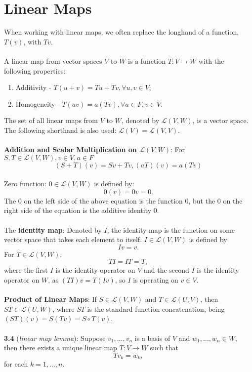 \documentclass{article}
\theoremstyle{definition}
\begin{document}
\section{Linear Maps}
When working with linear maps, we often replace the longhand of a function, $T(v)$, with $Tv$. \\ \\
A linear map from vector spaces $V$ to $W$ is a function $T: V \rightarrow W$ with the following properties:
\begin{enumerate}
\item Additivity - $T(u + v) = Tu + Tv, \forall u, v \in V$;
\item Homogeneity - $T(av) = a(Tv), \forall a \in F, v \in V$.
\end{enumerate} $ $ \\
The set of all linear maps from $V$ to $W$, denoted by $\mathcal{L}(V, W)$, is a vector space. The following shorthand is also used: $\mathcal{L}(V) = \mathcal{L}(V, V).$ \\ \\
\textbf{Addition and Scalar Multiplication on $\mathcal{L}(V, W)$}: For $S, T \in \mathcal{L}(V, W), v \in V, a \in F$ $$(S + T)(v) = Sv + Tv, (aT)(v) = a(Tv)$$ \\
Zero function: $0 \in \mathcal{L}(V, W)$ is defined by: $$0(v) = 0v = 0.$$ The 0 on the left side of the above equation is the function 0, but the 0 on the right side of the equation is the additive identity 0. \\ \\
The \textbf{identity map}: Denoted by $I$, the identity map is the function on some vector space that takes each element to itself. $I \in \mathcal{L}(V, W)$ is defined by $$Iv = v.$$ For $T \in \mathcal{L}(V, W),$ $$TI = IT = T,$$ where the first $I$ is the identity operator on $V$ and the second $I$ is the identity operator on $W$, as $(TI)v = T(Iv)$, so $I$ is operating on $v \in V$. \\ \\
\textbf{Product of Linear Maps}: If $S \in \mathcal{L}(V, W)$ and $T \in \mathcal{L}(U, V)$, then $ST \in \mathcal{L}(U, W)$, where $ST$ is the standard function concatenation, being $(ST)(v) = S(Tv) = S \circ T(v)$. \\ \\
\textbf{3.4} (\textit{linear map lemma}): Suppose $v_1, \dots, v_n$ is a basis of $V$ and $w_1, \dots, w_n \in W,$ then there exists a unique linear map $T: V \rightarrow W$ such that $$Tv_k = w_k,$$ for each $k = 1, \dots, n$. \\ \\
\end{document}
